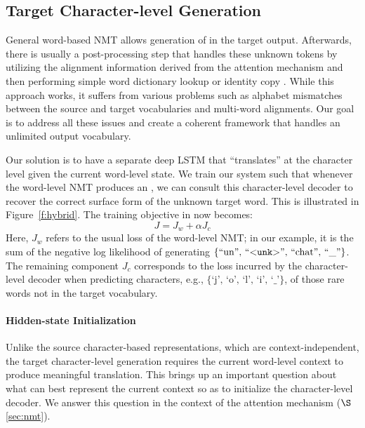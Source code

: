 \subsection{Target Character-level Generation}
\label{subsec:tgt}
General word-based NMT allows generation of \unk{} in the target output.
Afterwards, there is usually a post-processing step that handles
these unknown tokens by utilizing the
alignment information derived from the attention mechanism and then performing
simple word dictionary lookup or identity copy \cite{luong15attn,jean15}. 
While this approach works, it suffers from various problems such as alphabet
mismatches between the source and target vocabularies and multi-word
alignments.
Our goal is to address all
these issues and create a
coherent framework that handles an unlimited output vocabulary.

Our solution is to have a separate deep LSTM that ``translates'' at the
character level given the current word-level state. We train our system such
that whenever the word-level NMT
produces an \unk{}, we can consult this character-level decoder to recover the correct surface form of the
unknown target word. This is illustrated in Figure~\ref{f:hybrid}.
The training objective in  now becomes: %
\begin{equation}
J = J_{w} + \alpha J_{c}
\label{e:char_obj}
\end{equation}
Here, $J_{w}$ refers to the usual loss of the word-level NMT; in
our example, it is the sum of the negative log likelihood of
generating $\{\mbox{``un'', ``$<$\texttt{unk}$>${}'', ``chat'', ``\_''}\}$. The remaining component $J_c$
corresponds to the loss incurred by the character-level 
decoder when predicting characters, e.g., $\{\mbox{`j', `o', `l', `i',
`\_'}\}$, of those rare words not in the
target vocabulary. 


\paragraph{Hidden-state Initialization} %
\label{subsubsec:h}
Unlike the source character-based representations, which are
context-independent, the target character-level generation requires the
current word-level context to produce meaningful translation.
This brings up an important
question about what can best represent the current context so as to
initialize the character-level decoder. We answer this question in the context
of the attention mechanism ($\S$\ref{sec:nmt}). 

